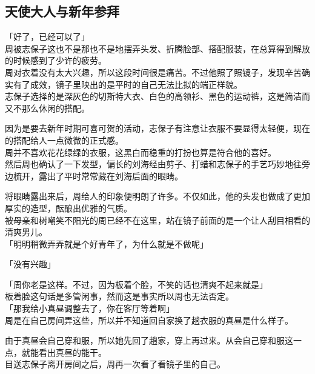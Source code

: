 \subsection{天使大人与新年参拜}

「好了，已经可以了」\\

周被志保子这也不是那也不是地摆弄头发、折腾脸部、搭配服装，在总算得到解放的时候感到了少许的疲劳。\\

周对衣着没有太大兴趣，所以这段时间很是痛苦。不过他照了照镜子，发现辛苦确实有了成效，镜子里映出的是平时的自己无法比拟的端正样貌。\\

志保子选择的是深灰色的切斯特大衣、白色的高领衫、黑色的运动裤，这是简洁而又不那么休闲的搭配。

因为是要去新年时期可喜可贺的活动，志保子有注意让衣服不要显得太轻便，现在的搭配给人一点微微的正式感。\\

周并不喜欢花花绿绿的衣服，这黑白而稳重的打扮也算是符合他的喜好。\\

然后周也确认了一下发型，偏长的刘海经由剪子、打蜡和志保子的手艺巧妙地往旁边梳开，露出了平时常常藏在刘海后面的眼睛。

将眼睛露出来后，周给人的印象便明朗了许多。不仅如此，他的头发也做成了更加厚实的造型，酝酿出优雅的气质。\\

被母亲和树嘲笑不阳光的周已经不在这里，站在镜子前面的是一个让人刮目相看的清爽男儿。\\

「明明稍微弄弄就是个好青年了，为什么就是不做呢」

「没有兴趣」

「周你老是这样。不过，因为板着个脸，不笑的话也清爽不起来就是」\\

板着脸这句话是多管闲事，然而这是事实所以周也无法否定。\\

「那我给小真昼调整去了，你在客厅等着啊」\\

周是在自己房间弄这些，所以并不知道回自家换了趟衣服的真昼是什么样子。

由于真昼会自己穿和服，所以她先回了趟家，穿上再过来。从会自己穿和服这一点，就能看出真昼的能干。\\

目送志保子离开房间之后，周再一次看了看镜子里的自己。\\

